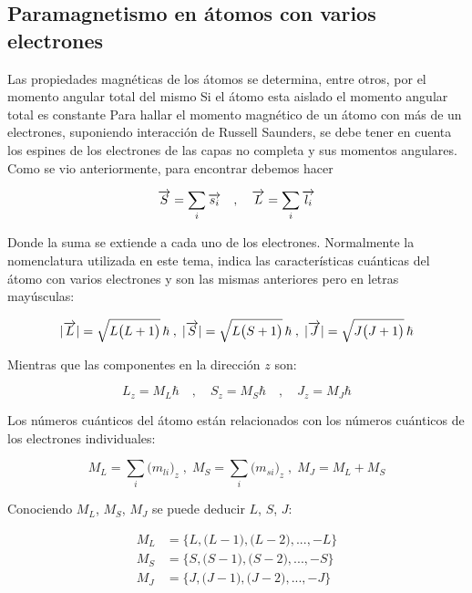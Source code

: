 \subsection{Paramagnetismo en átomos con varios electrones}

Las propiedades magnéticas de los átomos se determina, entre otros, por el momento angular total del mismo Si el átomo esta aislado el momento angular total es constante Para hallar el momento magnético de un átomo con más de un electrones, suponiendo interacción de Russell Saunders, se debe tener en cuenta los espines de los electrones de las capas no completa y sus momentos angulares. Como se vio anteriormente, para encontrar debemos hacer

\begin{equation}
\overrightarrow{S}=\sum_{i}\overrightarrow{s_{i}} \quad, \quad \overrightarrow{L}=\sum_{i}\overrightarrow{l_{i}} 
\end{equation}

Donde la suma se extiende a cada uno de los electrones. Normalmente la nomenclatura utilizada en este tema, indica las características cuánticas del átomo con varios electrones y son las mismas anteriores pero en letras mayúsculas:

\begin{equation}
	|\overrightarrow{L}|=\sqrt{L\big(L+1\big)}\,\hbar \;,\; |\overrightarrow{S}|=\sqrt{L\big(S+1\big)}\,\hbar \;,\; |\overrightarrow{J}|=\sqrt{J\big(J+1\big)}\,\hbar
\end{equation}

Mientras que las componentes en la dirección $z$ son:

\begin{equation}
	L_{z}=M_{L}\hbar \quad, \quad S_{z}=M_{S}\hbar  \quad, \quad J_{z}=M_{J}\hbar 
\end{equation}

Los números cuánticos del átomo están relacionados con los números cuánticos de los electrones individuales:

\begin{equation}
M_{L}=\sum_{i}\big( m_{li}\big)_{z} \;,\; M_{S}=\sum_{i}\big( m_{si}\big)_{z} \;,\;M_{J}=M_{L}+M_{S}
\end{equation}

Conociendo $M_{L}$, $M_{S}$, $M_{J}$ se puede deducir $L$, $S$, $J$:

\begin{equation}
\begin{aligned}
	M_{L} &= \lbrace L, \big(L-1\big), \big(L-2\big),..., -L\rbrace \\
	M_{S} &= \lbrace S, \big(S-1\big), \big(S-2\big),..., -S\rbrace \\
	M_{J} &= \lbrace J, \big(J-1\big), \big(J-2\big),..., -J\rbrace 
\end{aligned}
\end{equation}


